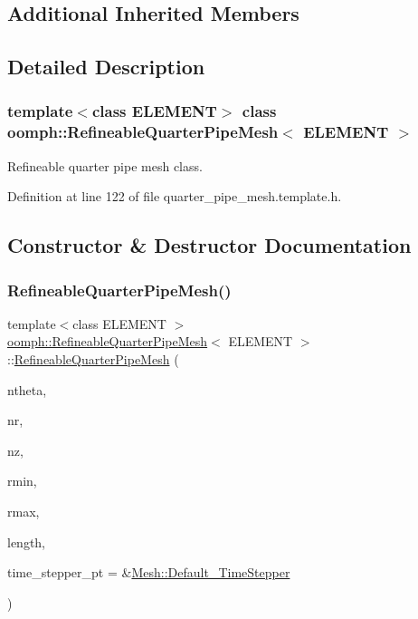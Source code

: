 \subsection*{Additional Inherited Members}


\subsection{Detailed Description}
\subsubsection*{template$<$class E\+L\+E\+M\+E\+NT$>$\newline
class oomph\+::\+Refineable\+Quarter\+Pipe\+Mesh$<$ E\+L\+E\+M\+E\+N\+T $>$}

Refineable quarter pipe mesh class. 

Definition at line 122 of file quarter\+\_\+pipe\+\_\+mesh.\+template.\+h.



\subsection{Constructor \& Destructor Documentation}
\mbox{\label{classoomph_1_1RefineableQuarterPipeMesh_ac4b3f592279a2437487ddce284b406a6}} 
\subsubsection{\texorpdfstring{Refineable\+Quarter\+Pipe\+Mesh()}{RefineableQuarterPipeMesh()}}
{\footnotesize\ttfamily template$<$class E\+L\+E\+M\+E\+NT $>$ \\
\hyperlink{classoomph_1_1RefineableQuarterPipeMesh}{oomph\+::\+Refineable\+Quarter\+Pipe\+Mesh}$<$ E\+L\+E\+M\+E\+NT $>$\+::\hyperlink{classoomph_1_1RefineableQuarterPipeMesh}{Refineable\+Quarter\+Pipe\+Mesh} (\begin{DoxyParamCaption}\item[{const unsigned \&}]{ntheta,  }\item[{const unsigned \&}]{nr,  }\item[{const unsigned \&}]{nz,  }\item[{const double \&}]{rmin,  }\item[{const double \&}]{rmax,  }\item[{const double \&}]{length,  }\item[{\hyperlink{classoomph_1_1TimeStepper}{Time\+Stepper} $\ast$}]{time\+\_\+stepper\+\_\+pt = {\ttfamily \&\hyperlink{classoomph_1_1Mesh_a12243d0fee2b1fcee729ee5a4777ea10}{Mesh\+::\+Default\+\_\+\+Time\+Stepper}} }\end{DoxyParamCaption})\hspace{0.3cm}{\ttfamily [inline]}}



